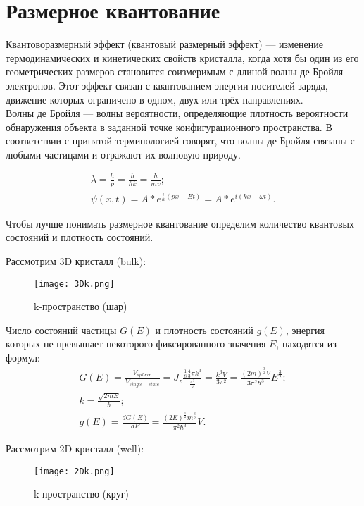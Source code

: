 \section{Размерное квантование}


Квантоворазмерный эффект (квантовый размерный эффект) — изменение термодинамических и кинетических свойств кристалла, когда хотя бы один из его геометрических размеров становится соизмеримым с длиной волны де Бройля электронов. Этот эффект связан с квантованием энергии носителей заряда, движение которых ограничено в одном, двух или трёх направлениях.\\

Волны де Бройля — волны вероятности, определяющие плотность вероятности обнаружения объекта в заданной точке конфигурационного пространства. В соответствии с принятой терминологией говорят, что волны де Бройля связаны с любыми частицами и отражают их волновую природу.

\begin{gather*} 
	\lambda = \frac{h}{p} = \frac{h}{\hbar k} = \frac{h}{mv};\\
	\psi(x, t) = A*e^{\frac{i}{\hbar}(px-Et)} = A*e^{i(kx-\omega t)}.
\end{gather*}

Чтобы лучше понимать размерное квантование определим количество квантовых состояний и плотность состояний.

Рассмотрим 3D кристалл (bulk):
\begin{figure}[h]
	\centering
	\texttt{[image: 3Dk.png]}
	\caption{k-пространство (шар)}
	\label{3Dk}
\end{figure}

Число состояний частицы $G(E)$ и плотность состояний $g(E)$, энергия которых не превышает некоторого фиксированного значения $E$, находятся из формул:
\begin{gather*} 
	G(E) = \frac{V_{sphere}}{V_{single-state}} = J_{z}\frac{\frac{1}{8}\frac{4}{3}\pi k^{3}}{\frac{\pi^3}{V}} = \frac{k^{3}V}{3\pi^{2}} = \frac{(2m)^{\frac{3}{2}}V}{3\pi^{2}\hbar^{3}}E^{\frac{3}{2}};\\
	k = \frac{\sqrt{2mE}}{\hbar};\\
	g(E) = \frac{dG(E)}{dE} = \frac{(2E)^{\frac{1}{2}}m^{\frac{3}{2}}}{\pi^{2}\hbar^{3}}V.
\end{gather*}

Рассмотрим 2D кристалл (well):
\begin{figure}[h]
	\centering
	\texttt{[image: 2Dk.png]}
	\caption{k-пространство (круг)}
	\label{2Dk}
\end{figure}

